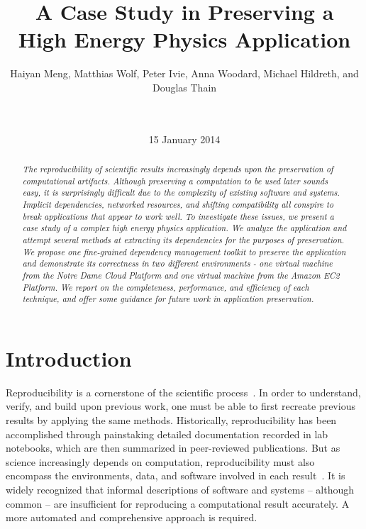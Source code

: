 \documentclass{sig-alternate}
\begin{document}
\title{A Case Study in Preserving a\\High Energy Physics Application}
\author{
Haiyan Meng, Matthias Wolf, Peter Ivie, Anna Woodard, Michael Hildreth, and Douglas Thain\\
\\
\\
}
\date{15 January 2014}
\maketitle

\begin{abstract}
\it The reproducibility of scientific results increasingly
depends upon the preservation of computational artifacts.
Although preserving a computation to be used later sounds
easy, it is surprisingly difficult due to the complexity
of existing software and systems.  Implicit dependencies,
networked resources, and shifting compatibility all conspire
to break applications that appear to work well.  To investigate
these issues, we present a case study of a complex high energy
physics application.  We analyze the application and attempt
several methods at extracting its dependencies for the purposes
of preservation. 
We propose one fine-grained dependency management toolkit to preserve the application and demonstrate its correctness in two different environments - one virtual machine from the Notre Dame Cloud Platform and one virtual machine from the Amazon EC2 Platform. 
We report on the completeness, performance,
and efficiency of each technique, and offer some guidance for
future work in application preservation.
\end{abstract}



\section{Introduction}

Reproducibility is a cornerstone of the scientific process~\cite{borgman2012data}.
In order to understand, verify, and build upon previous work,
one must be able to first recreate previous results by applying
the same methods. Historically, reproducibility has been
accomplished through painstaking detailed documentation recorded
in lab notebooks, which are then summarized in peer-reviewed publications.
But as science increasingly depends on computation,
reproducibility must also encompass the environments, data, and software
involved in each result~\cite{zabolitzky2002preserving}. It is widely recognized that informal
descriptions of software and systems -- although common -- are insufficient
for reproducing a computational result accurately.
A more automated and comprehensive approach is required.
\end{document}
